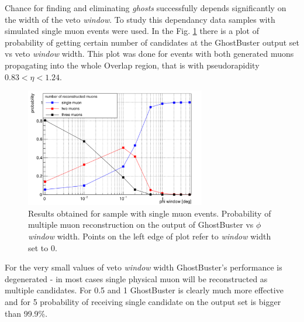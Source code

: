 Chance for finding and eliminating \textit{ghosts} successfully depends significantly on the width of the veto \textit{window}. To study this dependancy data samples with simulated single muon events were used. In the Fig. \ref{prob_vs_phi} there is a plot of probability of getting certain number of candidates at the GhostBuster output set vs veto \textit{window} width. This plot was done for events with both generated muons propagating into the whole Overlap region, that is with pseudorapidity $0.83 < \eta < 1.24$.
\begin{figure}[ht]
\centering
\includegraphics[width=0.7\textwidth]{prob_phi.pdf}
\caption{Results obtained for sample with single muon events. Probability of multiple muon reconstruction on the output of GhostBuster vs $\phi$ \textit{window} width. Points on the left edge of plot refer to \textit{window} width set to 0\textdegree. }
\label{prob_vs_phi}
\end{figure} 
For the very small values of veto \textit{window} width GhostBuster's performance is degenerated - in most cases single physical muon will be reconstructed as multiple candidates. For 0.5\textdegree\textrm{ }and 1\textdegree\textrm{ }GhostBuster is clearly much more effective and for 5\textdegree\textrm{ }probability of receiving single candidate on the output set is bigger than 99.9\%. 

